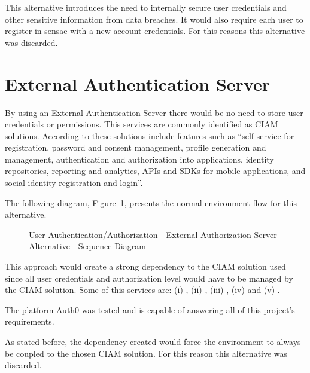 This alternative introduces the need to internally secure user credentials and other sensitive information from data breaches. It would also require each user to register in sensae with a new account credentials. For this reasons this alternative was discarded.

\section{External Authentication Server}
\label{sec:design:alternatives:auth:externalauth}

By using an External Authentication Server there would be no need to store user credentials or permissions. This services are commonly identified as \gls{CIAM} solutions. According to \cite{ciam} these solutions include features such as ``self-service for registration, password and consent management, profile generation and management, authentication and authorization into applications, identity repositories, reporting and analytics, APIs and SDKs for mobile applications, and social identity registration and login''.

The following diagram, Figure~\ref{fig:design:alternatives:auth:externalauth:diagram}, presents the normal environment flow for this alternative.

\begin{figure}[H]
   \centering
   \resizebox{\columnwidth}{!}
   {
      
   }
   \caption[User Authentication/Authorization - External Authorization Server Alternative - Sequence Diagram]{User Authentication/Authorization - External Authorization Server Alternative - Sequence Diagram}
   \label{fig:design:alternatives:auth:externalauth:diagram}
\end{figure}

This approach would create a strong dependency to the \gls{CIAM} solution used since all user credentials and authorization level would have to be managed by the \gls{CIAM} solution.
Some of this services are: (i) , (ii) , (iii) , (iv)  and (v) .

The platform Auth0 was tested and is capable of answering all of this project's requirements.

As stated before, the dependency created would force the environment to always be coupled to the chosen \gls{CIAM} solution. For this reason this alternative was discarded.

